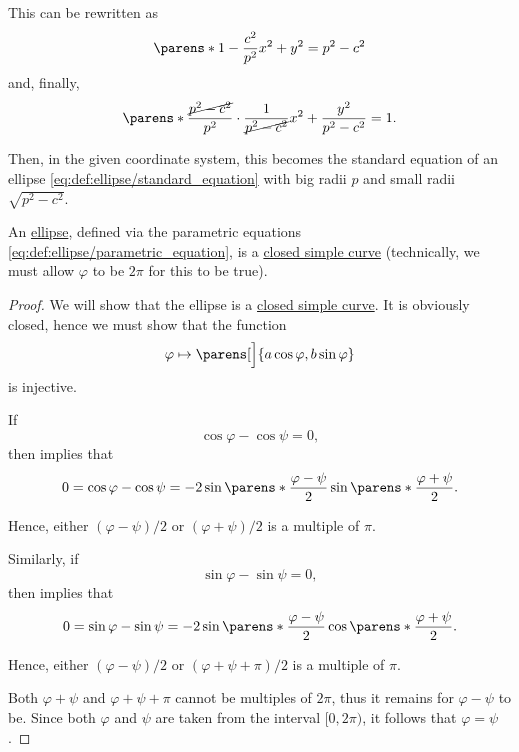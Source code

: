 \begin{defproof}
  This can be rewritten as
  \begin{equation*}
    \parens*{ 1 - \frac {c^2} {p^2} } x^2 + y^2 = p^2 - c^2
  \end{equation*}
  and, finally,
  \begin{equation*}
    \parens*{ \frac {\cancel{p^2 - c^2}} {p^2} \cdot \frac 1 {\cancel{p^2 - c^2}} } x^2 + \frac {y^2} {p^2 - c^2} = 1.
  \end{equation*}

  Then, in the given coordinate system, this becomes the standard equation of an ellipse \eqref{eq:def:ellipse/standard_equation} with big radii \( p \) and small radii \( \sqrt{p^2 - c^2} \).
\end{defproof}

\begin{proposition}\label{thm:ellipse_is_closed_simple_curve}
  An \hyperref[def:ellipse]{ellipse}, defined via the parametric equations \eqref{eq:def:ellipse/parametric_equation}, is a \hyperref[def:simple_curve]{closed simple curve} (technically, we must allow \( \varphi \) to be \( 2\pi \) for this to be true).
\end{proposition}
\begin{proof}
  We will show that the ellipse is a \hyperref[def:simple_curve]{closed simple curve}. It is obviously closed, hence we must show that the function
  \begin{equation*}
    \varphi \mapsto \parens[\Big]{ a \cos \varphi, b \sin \varphi }
  \end{equation*}
  is injective.

  If
  \begin{equation*}
    \cos \varphi - \cos \psi = 0,
  \end{equation*}
  then  implies that
  \begin{equation*}
    0
    =
    \cos \varphi - \cos \psi
    =
    -2 \sin\parens*{ \frac{\varphi - \psi} 2 } \sin\parens*{ \frac{\varphi + \psi} 2 }.
  \end{equation*}

  Hence, either \( (\varphi - \psi) / 2 \) or \( (\varphi + \psi) / 2 \) is a multiple of \( \pi \).

  Similarly, if
  \begin{equation*}
    \sin \varphi - \sin \psi = 0,
  \end{equation*}
  then  implies that
  \begin{equation*}
    0
    =
    \sin \varphi - \sin \psi
    =
    -2 \sin\parens*{ \frac{\varphi - \psi} 2 } \cos\parens*{ \frac{\varphi + \psi} 2 }.
  \end{equation*}

  Hence, either \( (\varphi - \psi) / 2 \) or \( (\varphi + \psi + \pi) / 2 \) is a multiple of \( \pi \).

  Both \( \varphi + \psi \) and \( \varphi + \psi + \pi \) cannot be multiples of \( 2\pi \),  thus it remains for \( \varphi - \psi \) to be. Since both \( \varphi \) and \( \psi \) are taken from the interval \( [0, 2\pi) \), it follows that \( \varphi = \psi \).
\end{proof}


